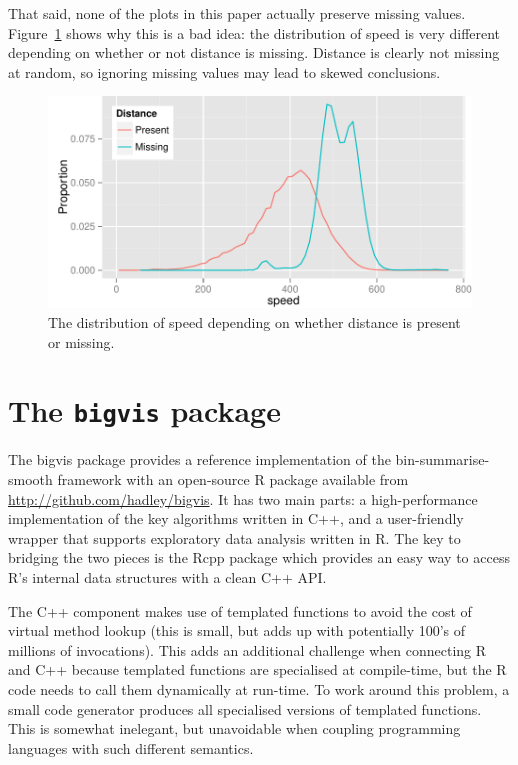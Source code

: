 \documentclass[journal]{vgtc}                %
\begin{document}
That said, none of the plots in this paper actually preserve missing values. Figure~\ref{fig:missing} shows why this is a bad idea: the distribution of speed is very different depending on whether or not distance is missing. Distance is clearly not missing at random, so ignoring missing values may lead to skewed conclusions.

\begin{figure}
  \centering
   \includegraphics[width=\linewidth]{speed-distance}
 \caption{The distribution of speed depending on whether distance is present or missing.}
 \label{fig:missing}
\end{figure}

\section{The {\tt bigvis} package}
\label{sec:bigvis}

The bigvis package provides a reference implementation of the bin-summarise-smooth framework with an open-source R package available from \url{http://github.com/hadley/bigvis}. It has two main parts: a high-performance implementation of the key algorithms written in C++, and a user-friendly wrapper that supports exploratory data analysis written in R. The key to bridging the two pieces is the Rcpp package \citep{eddelbuettel:2011} which provides an easy way to access R's internal data structures with a clean C++ API. 

The C++ component makes use of templated functions to avoid the cost of virtual method lookup (this is small, but adds up with potentially 100's of millions of invocations). This adds an additional challenge when connecting R and C++ because templated functions are specialised at compile-time, but the R code needs to call them dynamically at run-time. To work around this problem, a small code generator produces all specialised versions of templated functions. This is somewhat inelegant, but unavoidable when coupling programming languages with such different semantics.
\end{document}

